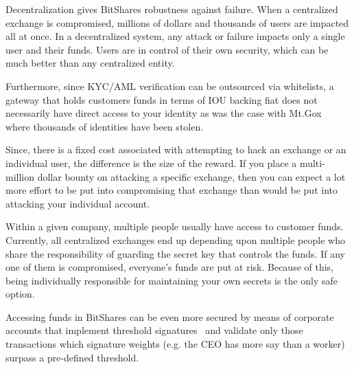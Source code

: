 Decentralization gives BitShares robustness against failure. When a
centralized exchange is compromised, millions of dollars and thousands of users
are impacted all at once. In a decentralized system, any attack or failure
impacts only a single user and their funds. Users are in control of their own
security, which can be much better than any centralized entity.

Furthermore, since KYC/AML verification can be outsourced via whitelists, a
gateway that holds customers funds in terms of IOU backing fiat does not
necessarily have direct access to your identity as was the case with
Mt.Gox~\cite{mtgox} where thousands of identities have been stolen.

Since, there is a fixed cost associated with attempting to hack an exchange or
an individual user, the difference is the size of the reward. If you place a
multi-million dollar bounty on attacking a specific exchange, then you can
expect a lot more effort to be put into compromising that exchange than would
be put into attacking your individual account.

Within a given company, multiple people usually have access to customer funds.
%
%
Currently, all centralized exchanges end up depending upon multiple people who
share the responsibility of guarding the secret key that controls the funds.
If any one of them is compromised, everyone's funds are put at risk. Because of
this, being individually responsible for maintaining your own secrets is the
only safe option.

Accessing funds in BitShares can be even more secured by means of corporate
accounts that implement threshold signatures~\cite{bts:general,ripple:multisig}
and validate only those transactions which signature weights (e.g. the CEO has
more say than a worker) surpass a pre-defined threshold.
